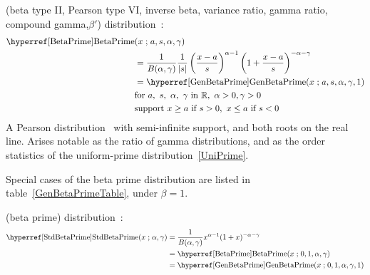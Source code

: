 

\label{sec:BetaPrime}



 (beta type II, Pearson type VI, inverse beta, variance ratio, gamma ratio, compound gamma,$\beta'$) distribution~\cite{Pearson1901,Johnson1995}:
\begin{align}
\label{BetaPrime}
\opr{BetaPrime}&(x\given  a, s,\alpha, \gamma) \\ \notag&= \frac{1}{B(\alpha,\gamma)}\frac{1}{|s|} \left(\frac{x-a}{s}\right)^{\alpha -1} \left(1+\frac{x-a}{s}\right)^{-\alpha-\gamma }  \checked
\\
&= \opr{GenBetaPrime}(x\given a,s, \alpha,\gamma,1) \notag \checked
\\
& \text{for }  a,\ s,\ \alpha,\ \gamma \text{ in } \Real, \  \alpha>0, \gamma>0  \checked
\notag \\ 
& \text{support } x \geq a \ \text{if}\ s > 0,  \ x\leq a  \ \text{if}\  s < 0 
\notag
\end{align}
A Pearson distribution~ with semi-infinite support, and both roots on the real line. Arises notable as the ratio of gamma distributions, and as the order statistics of the uniform-prime distribution~\eqref{UniPrime}.



Special cases of the beta prime distribution are listed in table~\ref{GenBetaPrimeTable}, under $\beta=1$.


 (beta prime) distribution~\cite{Pearson1901}:
\begin{align}
\label{StdBetaPrime}
\opr{StdBetaPrime}(x\given \alpha, \gamma) &= \frac{1}{B(\alpha,\gamma)} x^{\alpha -1} (1+x )^{-\alpha-\gamma } \checked
\\&= \opr{BetaPrime}(x\given  0,1, \alpha,\gamma) \notag	\checked
\\&= \opr{GenBetaPrime}(x\given  0,1, \alpha,\gamma,1) \notag \checked
\end{align}


